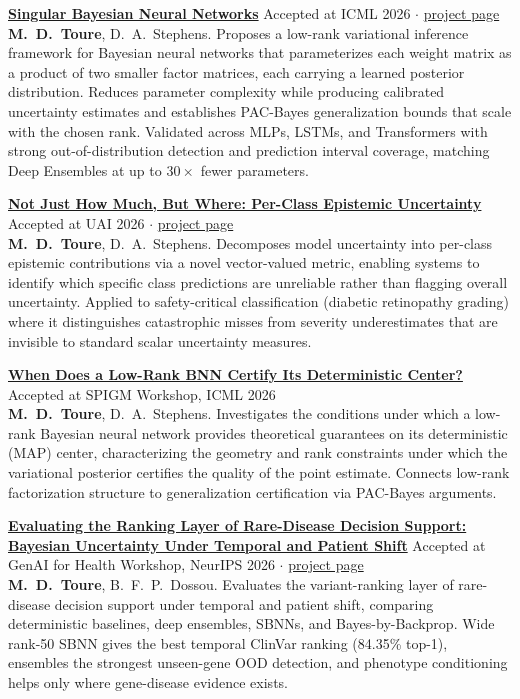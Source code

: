 \documentclass[10pt, a4paper]{article}
\newcommand{\pub}[4]{
    \vspace{0.3em}
    \noindent \textbf{\href{#2}{#1}} \hfill {\small #3} \\
    {\small #4}
}
\begin{document}
\pub{Singular Bayesian Neural Networks}
{https://arxiv.org/abs/2602.00387}
{\textcolor{theme}{Accepted at ICML 2026} $\cdot$ \href{https://arradiat.github.io/projects/singular-bnn/}{project page}} 
{{\textbf{M.\ D.\ Toure}}, D.\ A.\ Stephens.
Proposes a low-rank variational inference framework for Bayesian neural networks that parameterizes each weight matrix as a product of two smaller factor matrices, each carrying a learned posterior distribution. Reduces parameter complexity while producing calibrated uncertainty estimates and establishes PAC-Bayes generalization bounds that scale with the chosen rank. Validated across MLPs, LSTMs, and Transformers with strong out-of-distribution detection and prediction interval coverage, matching Deep Ensembles at up to $30\times$ fewer parameters.}

\pub{Not Just How Much, But Where: Per-Class Epistemic Uncertainty}
{https://arxiv.org/abs/2602.21160}
{\textcolor{theme}{Accepted at UAI 2026} $\cdot$ \href{https://arradiat.github.io/projects/per-class-epistemic/}{project page}}
{{\textbf{M.\ D.\ Toure}}, D.\ A.\ Stephens.
Decomposes model uncertainty into per-class epistemic contributions via a novel vector-valued metric, enabling systems to identify which specific class predictions are unreliable rather than flagging overall uncertainty. Applied to safety-critical classification (diabetic retinopathy grading) where it distinguishes catastrophic misses from severity underestimates that are invisible to standard scalar uncertainty measures.}

\pub{When Does a Low-Rank BNN Certify Its Deterministic Center?}
{https://openreview.net/forum?id=zo49sqP8xD}
{\textcolor{theme}{Accepted at SPIGM Workshop, ICML 2026}}
{{\textbf{M.\ D.\ Toure}}, D.\ A.\ Stephens.
Investigates the conditions under which a low-rank Bayesian neural network provides
theoretical guarantees on its deterministic (MAP) center, characterizing the geometry
and rank constraints under which the variational posterior certifies the quality of
the point estimate. Connects low-rank factorization structure to generalization
certification via PAC-Bayes arguments.}

\vspace{0.3em}
\begin{minipage}{\linewidth}
\noindent \textbf{\href{https://openreview.net/forum?id=hAuJBIQHEr}{Evaluating the Ranking Layer of Rare-Disease Decision Support: Bayesian Uncertainty Under Temporal and Patient Shift}} \hfill {\small \textcolor{theme}{Accepted at GenAI for Health Workshop, NeurIPS 2026} $\cdot$ \href{https://arradiat.github.io/projects/rare-disease-real-kid/}{project page}} \\
{\small {\textbf{M.\ D.\ Toure}}, B.\ F.\ P.\ Dossou.
Evaluates the variant-ranking layer of rare-disease decision support under temporal and patient shift, comparing deterministic baselines, deep ensembles, SBNNs, and Bayes-by-Backprop. Wide rank-50 SBNN gives the best temporal ClinVar ranking (84.35\% top-1), ensembles the strongest unseen-gene OOD detection, and phenotype conditioning helps only where gene-disease evidence exists.}
\end{minipage}
\vspace{0.3em}
\end{document}
